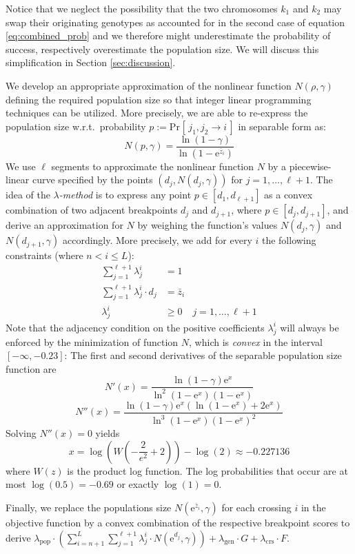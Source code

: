 \documentclass[runningheads]{llncs}
\renewcommand{\Pr}[2][]{\mathrm{Pr}_{#1} [\, #2 \, ]}
\begin{document}
Notice that we neglect the possibility that the two chromosomes $k_1$ and $k_2$ may swap their originating genotypes as accounted for in the 
second case of equation \eqref{eq:combined_prob} and we therefore might underestimate the probability of success, respectively overestimate
the population size. We will discuss this simplification in Section \ref{sec:discussion}.

We develop an appropriate approximation of the nonlinear function $N(\rho, \gamma)$ defining the required population size so that integer linear 
programming techniques can be utilized.
More precisely, we are able to re-express the population size w.r.t.\ probability $p:=\Pr[]{j_1,j_2\rightarrow i}$ in separable form as: 
$$ N(p,\gamma) = \frac{\ln(1-\gamma)}{\ln(1-\mathrm e^{\bar{z}_i})} $$
We use $\ell$ segments to approximate the nonlinear function $N$ by a
piecewise-linear curve specified by the points $(d_j,N(d_j,\gamma))$ for
$j=1,\dots,\ell+1$. The idea of the \emph{$\lambda$-method} \cite{Steuer:1986} is to
express any point $p\in[d_1,d_{\ell+1}]$ as a convex combination of two adjacent
breakpoints $d_j$ and $d_{j+1}$, where  $p\in[d_j,d_{j+1}]$, and derive an
approximation for $N$ by weighing the function's values $N(d_j,\gamma)$ and
$N(d_{j+1},\gamma)$ accordingly. More precisely, we add for every $i$ the following
constraints (where $n < i \leq L$):
\begin{align}
  \sum_{j=1}^{\ell+1} \lambda^i_j &= 1&\\
  \sum_{j=1}^{\ell+1} \lambda^i_j\cdot d_j &= \bar{z}_i&\label{ttt}\\
  \lambda^i_j&\geq 0& j=1,\dots,\ell+1
\end{align}
Note that the adjacency condition on the positive coefficients $\lambda^i_j$ will
always be enforced by the minimization of function $N$, which is \emph{convex}
in the interval $[-\infty,-0.23]$:
The first and second derivatives of the separable population size function are
$$N'(x)=\frac{\ln(1-\gamma)\mathrm e^x}{\ln^2(1-\mathrm e^x)(1-\mathrm e^x)}$$
$$N''(x)=\frac{\ln(1-\gamma)\mathrm e^x\left(\ln(1-\mathrm e^x)+2\mathrm e^x\right)}{\ln^3(1-\mathrm e^x)(1-\mathrm e^x)^2}$$
Solving $N''(x) = 0$ yields
\[
x = \log(W\left(-\frac{2}{e^2}+2\right)) - \log(2) \approx -0.227136
\]
where $W(z)$ is the product log function.
The log probabilities that occur are at most $\log(0.5) = -0.69$ or exactly $\log(1)=0$. 


Finally, we replace the populations size $N(\mathrm e^{\bar{z}_i},\gamma)$ for each crossing $i$
in the objective function by a convex combination of the respective breakpoint scores to derive 
$\lambda_{\mathrm{pop}}\cdot\left(\sum_{i=n+1}^L\sum_{j=1}^{\ell+1} \lambda^i_j\cdot N(\mathrm e^{d_j},\gamma)\right) + \lambda_{\mathrm{gen}}\cdot G + \lambda_{\mathrm{crs}}\cdot F.$
\end{document}
